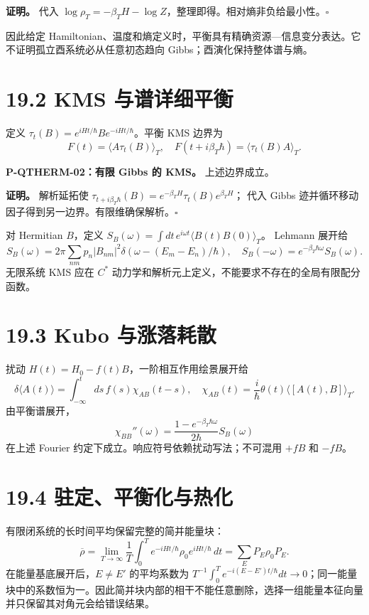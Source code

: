 \documentclass[
  11pt,
  oneside]{book}
\begin{document}
\textbf{证明。} 代入
\(\log\rho_T=-\beta_TH-\log Z\)，整理即得。相对熵非负给最小性。\(\square\)

因此给定
Hamiltonian、温度和熵定义时，平衡具有精确资源---信息变分表达。它不证明孤立酉系统必从任意初态趋向
Gibbs；酉演化保持整体谱与熵。

\section{19.2 KMS 与谱详细平衡}

定义 \(\tau_t(B)=e^{iHt/\hbar}Be^{-iHt/\hbar}\)。平衡 KMS 边界为 \[
F(t)=\langle A\tau_t(B)\rangle_T,\quad
F(t+i\beta_T\hbar)=\langle\tau_t(B)A\rangle_T.
\]

\protect\hypertarget{p-qtherm-02}{}{}

\textbf{P-QTHERM-02：有限 Gibbs 的 KMS。} 上述边界成立。

\textbf{证明。} 解析延拓使
\(\tau_{t+i\beta_T\hbar}(B)= e^{-\beta_TH}\tau_t(B)e^{\beta_TH}\)； 代入
Gibbs 迹并循环移动因子得到另一边界。有限维确保解析。\(\square\)

对 Hermitian \(B\)，定义
\(S_B(\omega)=\int dt\,e^{i\omega t}\langle B(t)B(0)\rangle_T\)。
Lehmann 展开给 \[
S_B(\omega)=2\pi\sum_{nm}p_n|B_{nm}|^2
\delta(\omega-(E_m-E_n)/\hbar),
\quad S_B(-\omega)=e^{-\beta_T\hbar\omega}S_B(\omega).
\] 无限系统 KMS 应在 \(C^*\)
动力学和解析元上定义，不能要求不存在的全局有限配分函数。

\section{19.3 Kubo 与涨落耗散}

扰动 \(H(t)=H_0-f(t)B\)，一阶相互作用绘景展开给 \[
\delta\langle A(t)\rangle=
\int_{-\infty}^tds\,f(s)\chi_{AB}(t-s),\quad
\chi_{AB}(t)=\frac{i}{\hbar}\theta(t)\langle[A(t),B]\rangle_T.
\] 由平衡谱展开， \[
\chi_{BB}''(\omega)
=\frac{1-e^{-\beta_T\hbar\omega}}{2\hbar}S_B(\omega)
\] 在上述 Fourier 约定下成立。响应符号依赖扰动写法；不可混用 \(+fB\) 和
\(-fB\)。

\section{19.4 驻定、平衡化与热化}

有限闭系统的长时间平均保留完整的简并能量块： \[
\overline\rho=\lim_{T\to\infty}\frac1T\int_0^T
 e^{-iHt/\hbar}\rho_0e^{iHt/\hbar}\,dt
=\sum_E P_E\rho_0P_E.
\] 在能量基底展开后，\(E\ne E'\) 的平均系数为
\(T^{-1}\int_0^T e^{-i(E-E')t/\hbar}dt\to0\)；同一能量块中的系数恒为一。因此简并块内部的相干不能任意删除，选择一组能量本征向量并只保留其对角元会给错误结果。
\end{document}
